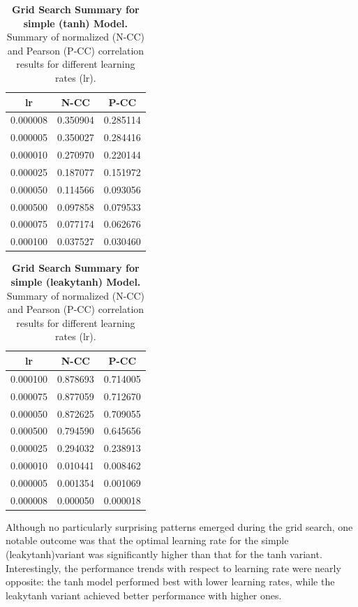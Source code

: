 \begin{table}
    \centering\footnotesize\sf
    \begin{tabular}{ccc}
    \toprule
    lr & N-CC & P-CC \\
    \midrule
    0.000008 & 0.350904 & 0.285114 \\
    0.000005 & 0.350027 & 0.284416 \\
    0.000010 & 0.270970 & 0.220144 \\
    0.000025 & 0.187077 & 0.151972 \\
    0.000050 & 0.114566 & 0.093056 \\
    0.000500 & 0.097858 & 0.079533 \\
    0.000075 & 0.077174 & 0.062676 \\
    0.000100 & 0.037527 & 0.030460 \\
    \bottomrule
    \end{tabular}
    \caption{\textbf{Grid Search Summary for simple (tanh) Model.} Summary of normalized (N-CC) and Pearson (P-CC) correlation results for different learning rates (lr).}
    \label{tab:grid_simple_tanh}
\end{table}

\begin{table}
    \centering\footnotesize\sf
    \begin{tabular}{ccc}
    \toprule
    lr & N-CC & P-CC \\
    \midrule
    0.000100 & 0.878693 & 0.714005 \\
    0.000075 & 0.877059 & 0.712670 \\
    0.000050 & 0.872625 & 0.709055 \\
    0.000500 & 0.794590 & 0.645656 \\
    0.000025 & 0.294032 & 0.238913 \\
    0.000010 & 0.010441 & 0.008462 \\
    0.000005 & 0.001354 & 0.001069 \\
    0.000008 & 0.000050 & 0.000018 \\
    \bottomrule
    \end{tabular}
    \caption{\textbf{Grid Search Summary for simple (leakytanh) Model.} Summary of normalized (N-CC) and Pearson (P-CC) correlation results for different learning rates (lr).}
    \label{tab:grid_simple_leakytanh}
\end{table}

Although no particularly surprising patterns emerged during the grid search, one notable outcome was that the optimal learning rate for the simple (leakytanh)variant was significantly higher than that for the tanh variant. Interestingly, the performance trends with respect to learning rate were nearly opposite: the tanh model performed best with lower learning rates, while the leakytanh variant achieved better performance with higher ones.

